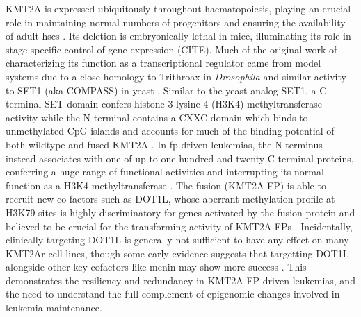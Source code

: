 %
KMT2A is expressed ubiquitously throughout haematopoiesis, playing an crucial role in maintaining normal numbers of progenitors and ensuring the availability of adult \glspl{hsc} \cite{Meyer2017, Antunes2020, Ernst2004} . Its deletion is embryonically lethal in mice, illuminating its role in stage specific control of gene expression (CITE). Much of the original work of characterizing its function as a transcriptional regulator came from model systems due to a close homology to Trithroax in \textit{Drosophila} and similar activity to SET1 (aka COMPASS) in yeast \cite{Popovic2005}. 
Similar to the yeast analog SET1, a C-terminal SET domain confers histone 3 lysine 4 (H3K4) methyltransferase activity while the N-terminal contains a CXXC domain which binds to unmethylated CpG islands and accounts for much of the binding potential of both wildtype and fused KMT2A \cite{JJ2003, Hsieh2003, Cierpicki2010,Ayton2004,LE2013}. 
In \gls{fp} driven leukemias, the N-terminus instead associates with one of up to one hundred and twenty C-terminal proteins, conferring a huge range of functional activities and interrupting its normal function as a H3K4 methyltransferase \cite{Hsieh2003}. 
The fusion (KMT2A-FP) is able to recruit new co-factors such as DOT1L, whose aberrant methylation profile at H3K79 sites is highly discriminatory for genes activated by the fusion protein and believed to be crucial for the transforming activity of KMT2A-FPs \cite{YOkada2005, KMBernt2011}. Incidentally, clinically targeting DOT1L is generally not sufficient to have any effect on many KMT2Ar cell lines, though some early evidence suggests that targetting DOT1L alongside other key cofactors like menin may show more success \cite{Dafflon2016}. This demonstrates the resiliency and redundancy in KMT2A-FP driven leukemias, and the need to understand the full complement of epigenomic changes involved in leukemia maintenance.  


